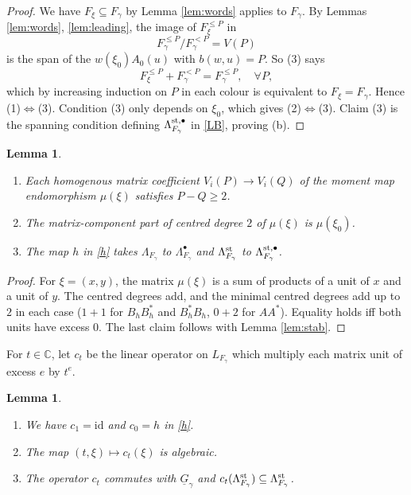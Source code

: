 \documentclass[11pt,reqno]{amsart}
\newtheorem{Lemma}[Theorem]{Lemma}
\theoremstyle{definition}
\theoremstyle{remark}
\def\bbC{\mathbb C}
\def\dG{\underline G}
\begin{document}
\begin{proof}
We have $F_\xi\subseteq F_\gamma$ by Lemma \ref{lem:words} applies to $F_\gamma$. 
By Lemmas \ref{lem:words}, \ref{lem:leading}, the image
of $F_\xi^{\leqslant P}$ in 
$$F_\gamma^{\leqslant P}/F_\gamma^{<P}=V(P)$$ 
is the span of the $w(\xi_0)A_0(u)$ with $b(w,u)=P$. So (3) says
$$F_\xi^{\leqslant P}+F_\gamma^{<P}=F_\gamma^{\leqslant P},\quad\forall P,$$ 
which by increasing induction on $P$ in each colour is equivalent to $F_\xi=F_\gamma$. 
Hence (1)$\Leftrightarrow$(3).
Condition (3) only depends on $\xi_0$, which gives (2)$\Leftrightarrow$(3). 
Claim (3) is the spanning condition defining $\Lambda_{F_\gamma}^{\rm st,\bullet}$ in \eqref{LB}, proving (b).
\end{proof}

\begin{Lemma}\label{lem:mu}\hfill
\begin{enumerate}[label=$\mathrm{(\alph*)}$,leftmargin=8mm,itemsep=1mm]
\item 
Each homogenous matrix coefficient $V_i(P)\to V_i(Q)$ of the moment map endomorphism $\mu(\xi)$ satisfies $P-Q\geqslant 2$.
\item
The matrix-component part of centred degree $2$ of $\mu(\xi)$ is $\mu(\xi_0)$.
\item
The map $h$ in \eqref{h} takes 
$\Lambda_{F_\gamma}$ to $\Lambda_{F_\gamma}^\bullet$ and $\Lambda^{\rm st}_{F_\gamma}$ to $\Lambda_{F_\gamma}^{\rm st,\bullet}$.
\end{enumerate}
\end{Lemma}

\begin{proof}
For $\xi=(x,y)$,  the matrix $\mu(\xi)$ is a sum of products of a unit of $x$ and a unit of $y$.
The centred degrees add, and the minimal centred degrees add up to $2$ in each case
($1+1$ for $B_hB^*_h$ and $B^*_hB_h$, $0+2$ for $AA^*$). Equality holds iff both units have excess $0$. The last claim follows with
Lemma \ref{lem:stab}.
\end{proof}

For $t\in\bbC$, let $c_t$ be the linear operator on $L_{F_\gamma}$ 
which multiply each matrix unit of excess $e$ by $t^e$. 

\begin{Lemma}\label{lem:contr}\hfill
\begin{enumerate}[label=$\mathrm{(\alph*)}$,leftmargin=8mm,itemsep=1mm]
\item 
We have $c_1=\mathrm{id}$ and $c_0=h$ in \eqref{h}.
\item
The map $(t,\xi)\mapsto c_t(\xi)$ is algebraic.
\item
The operator $c_t$ commutes with $\dG_\gamma$ and $c_t(\Lambda^{\rm st}_{F_\gamma})\subseteq\Lambda^{\rm st}_{F_\gamma}$.
\end{enumerate}
\end{Lemma}
\end{document}
